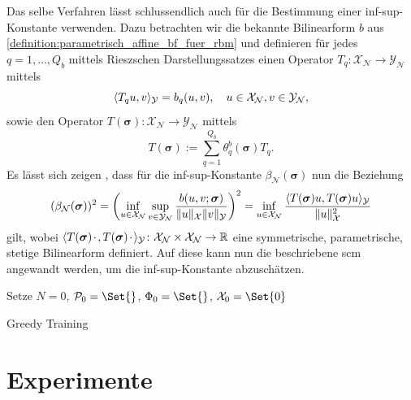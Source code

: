 \documentclass[../main.tex]{subfiles}
\begin{document}
Das selbe Verfahren lässt schlussendlich auch für die Bestimmung einer inf-sup-Konstante verwenden.
Dazu betrachten wir die bekannte Bilinearform $b$ aus \cref{definition:parametrisch_affine_bf_fuer_rbm} und definieren für jedes $q = 1, \dots, Q_{b}$ mittels Rieszschen Darstellungssatzes einen Operator $T_{q} \colon \mathcal X_{\mathcal N} \to \mathcal Y_{\mathcal N}$ mittels
\begin{equation}
    \langle T_{q} u,v\rangle_{\mathcal Y} = b_{q}(u, v), \quad u \in \mathcal X_{\mathcal N}, v \in \mathcal Y_{\mathcal N},
\end{equation}
sowie den Operator $T(\bm \sigma) \colon \mathcal X_{\mathcal N} \to \mathcal Y_{\mathcal N}$ mittels
\begin{equation}
    T(\bm \sigma) := \sum_{q = 1}^{Q_b} \theta_{q}^{b}(\bm \sigma) T_{q}.
\end{equation}
Es lässt sich zeigen \cite[476]{Huynh2007}, dass für die inf-sup-Konstante $\beta_{\mathcal N}(\bm \sigma)$ nun die Beziehung
\begin{equation}
    (\beta_{\mathcal N}(\bm \sigma))^{2}
    = \left( \inf_{u \in \mathcal X_{\mathcal N}} \sup_{v \in \mathcal Y_{\mathcal N}} \frac{b(u, v; \bm \sigma)}{\lVert u\rVert_{\mathcal X} \lVert v\rVert_{\mathcal Y}} \right)^{2}
    = \inf_{u \in \mathcal X_{\mathcal N}} \frac{\langle T(\bm \sigma)u,T(\bm \sigma)u\rangle_{\mathcal Y}}{\lVert u\rVert_{\mathcal X}^{2}}
\end{equation}
gilt, wobei $\langle T(\bm \sigma){\mkern2mu\cdot\mkern2mu},T(\bm \sigma){\mkern2mu\cdot\mkern2mu}\rangle_{\mathcal Y} \colon \mathcal X_{\mathcal N} \times \mathcal X_{\mathcal N} \to \mathbb{R}$ eine symmetrische, parametrische, stetige Bilinearform definiert.
Auf diese kann nun die beschriebene \acl{scm} angewandt werden, um die inf-sup-Konstante abzuschätzen.




\clearpage

\begin{algorithm}[tb]
    \DontPrintSemicolon
    \BlankLine
    Setze $N = 0$, $\mathcal P_{0} = \Set{}$, $\Phi_{0} = \Set{}$, $\mathcal X_{0} = \Set{0}$\;
    \caption{Greedy Training}
    \label{algorithm:greedy_training}
\end{algorithm}


\section{Experimente} %
\label{sec:experimente}


\end{document}

